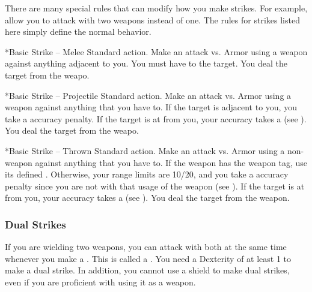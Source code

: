     There are many special rules that can modify how you make strikes.
    For example,  allow you to attack with two weapons instead of one.
    The rules for strikes listed here simply define the normal behavior.

    \begin{activeability}*{Basic Strike -- Melee}
      \abilityusagetime Standard action.
      \rankline
      Make an attack vs. Armor using a weapon against anything adjacent to you.
      You must have  to the target.
      \hit You deal the target  from the weapo.
    \end{activeability}

    \begin{activeability}*{Basic Strike -- Projectile}
      \abilityusagetime Standard action.
      \rankline
      Make an attack vs. Armor using a  weapon against anything that you have  to.
      If the target is adjacent to you, you take a  accuracy penalty.
      If the target is at  from you, your accuracy takes a   (see ).
      \hit You deal the target  from the weapo.
    \end{activeability}

    \begin{activeability}*{Basic Strike -- Thrown}
      \abilityusagetime Standard action.
      \rankline
      Make an attack vs. Armor using a non- weapon against anything that you have  to.
      If the weapon has the  weapon tag, use its defined .
      Otherwise, your range limits are 10/20, and you take a  accuracy penalty since you are not  with that usage of the weapon (see ).
      If the target is at  from you, your accuracy takes a   (see ).
      \hit You deal the target  from the weapon.
    \end{activeability}

    \subsubsection{Dual Strikes}\label{Dual Strikes}
      If you are wielding two weapons, you can attack with both at the same time whenever you make a .
      This is called a .
      You need a Dexterity of at least 1 to make a dual strike.
      In addition, you cannot use a shield to make dual strikes, even if you are proficient with using it as a weapon.


